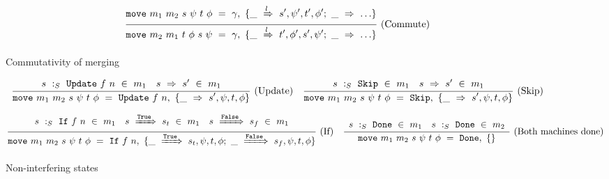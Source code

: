
\begin{figure*}

$$
\ruleI
{
    \MoveOut
        {\sptp}
        {\gamma}
        {\MoveT{l}{s',\psi',t',\phi'};~ \MoveTU{\ldots} }
}
{
    \mathtt{move}~m_2~m_1~t~\phi~s~\psi
    ~=~\gamma,~\{\MoveT{l}{t',\phi',s',\psi'};~ \MoveTU{\ldots} \}
}
\textrm{(Commute)}
$$

\caption{Commutativity of merging}
\label{fig:merge:gen:comm}
\end{figure*}

\begin{figure*}


$$
\ruleI
{
    \arrLR
        { \CheckStateTypeM{m_1}{s}{\Update{f}{n}} }
        { \TransUM{s}{s'}{m_1} }
}
{
    \MoveOut
        {\sptp}
        {\Update{f}{n}}
        {\MoveTU{\sPptpC}}
}
\textrm{(Update)}
\quad
\ruleI
{
    \arrLR
        { \CheckStateTypeM{m_1}{s}{\Skip} }
        { \TransUM{s}{s'}{m_1} }
}
{
    \MoveOut
        {\sptp}
        {\Skip}
        {\MoveTU{\sPptpC}}
}
\textrm{(Skip)}
$$

$$
\ruleI
{
    \arrLCR
        { \CheckStateTypeM{m_1}{s}{\If{f}{n}} }
        { \TransM{s}{\True}{s_t}{m_1} }
        { \TransM{s}{\False}{s_f}{m_1} }
}
{
    \MoveOut
        {\sptp}
        {\If{f}{n}}
        { \MoveT{\True}{s_t,\psi,t,\phi}
         ;~
          \MoveT{\False}{s_f,\psi,t,\phi}
        }
}
\textrm{(If)}
\quad
\ruleI
{
    \arrLR
        { \CheckStateTypeM{m_1}{s}{\Done} }
        { \CheckStateTypeM{m_2}{s}{\Done} }
}
{
    \MoveOut
        {\sptp}
        {\Done}
        {}
}
\textrm{(Both machines done)}
$$

\caption{Non-interfering states}
\label{fig:merge:gen:noninter}
\end{figure*}

